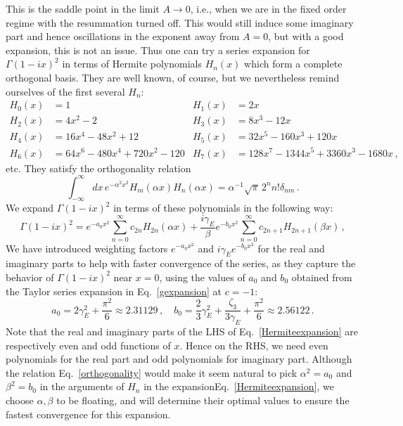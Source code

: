 \documentclass[a4,letterpaper,11pt]{article}
\newcommand{\nn}{\nonumber}
\newcommand{\be}{\begin{equation}}
\newcommand{\ee}{\end{equation}}
\newcommand{\eq}[1]{Eq.~\eqref{#1}}
\begin{document}
This is the saddle point in the limit $ A \rightarrow 0$, i.e., when we are in the fixed order regime with the resummation turned off. This would still induce some imaginary part and hence oscillations in the exponent away from $A=0$, but with a good expansion, this is not an issue.
Thus one can try a series expansion for $\Gamma(1-ix)^2$ in terms of Hermite polynomials $H_n(x)$ which form a complete orthogonal basis. 
They are well known, of course, but we nevertheless remind ourselves of the first several $H_{n}$:
\begin{align}
H_0(x) &= 1 & H_1(x) &= 2x  \\
H_2(x) &= 4x^2 - 2  & H_3(x) &= 8x^3 - 12x \nn \\
H_4(x) &= 16 x^4 - 48 x^2 + 12 & H_5(x) &= 32 x^5 - 160 x^3 + 120 x \nn \\
H_6(x) &= 64x^6 - 480 x^4 + 720 x^2 - 120 & H_7(x) &= 128 x^7 - 1344 x^5 + 3360 x^3 - 1680 x\,, \nn
\end{align}
etc. They satisfy the orthogonality relation
\be
\label{orthogonality}
\int_{-\infty}^\infty dx\,e^{-\alpha^2 x^2} H_m(\alpha x) H_n(\alpha  x) = \alpha^{-1}\sqrt{\pi}\, 2^n n! \delta_{nm}\,.
\ee
 We expand $\Gamma(1-ix)^2$ in terms of these polynomials in the following way:
\be
\label{Hermiteexpansion}
\Gamma(1-ix)^2  =  e^{-a_0 x^2} \sum_{n=0}^\infty c_{2n} H_{2n}(\alpha x) 
	+ \frac{i \gamma_E}{\beta} e^{-b_0 x^2} \sum_{n=0}^\infty c_{2n+1} H_{2n+1}(\beta x) \,,
\ee
We have introduced weighting factors $e^{-a_0 x^2}$ and $i \gamma_E  e^{-b_0 x^2}$ for the real and imaginary parts to help with faster convergence of the series, as they capture the behavior of $\Gamma(1-ix)^2$ near $x=0$, using the values of $a_0$ and $b_0$ obtained from the Taylor series expansion in \eq{gexpansion} at $c=-1$:
\be\label{a0b0}
a_0 =2\gamma_E^2+\frac{\pi^2}{6}\approx 2.31129\, , \quad b_0=\frac{2}{3}\gamma_E^2+\frac{\zeta_3}{3\gamma_E} +\frac{\pi^2}{6}\approx 2.56122
\,. \ee
Note that the real and imaginary parts of the  LHS of \eq{Hermiteexpansion} are  respectively even and odd functions of $x$. Hence on the RHS, we need even polynomials for the real part and odd polynomials for imaginary part. 
Although the relation \eq{orthogonality} would make it seem natural to pick $\alpha^2 = a_0$ and $\beta^2 =b_0$ in the arguments of $H_n$ in the expansion\eq{Hermiteexpansion}, we choose $\alpha,\beta$ to be floating, and will determine their optimal values to ensure the fastest convergence for this expansion.
 
\end{document}
